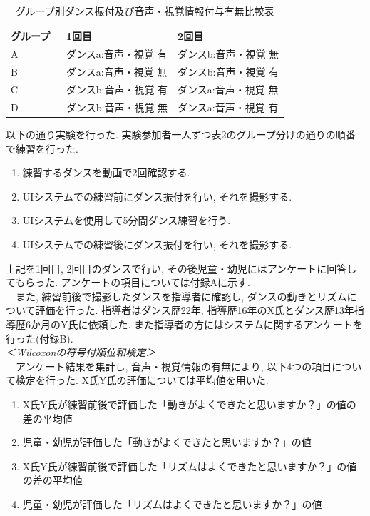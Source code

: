 \documentclass[paper]{ieicej}
\begin{document}
\begin{table}[t]
  \centering
  \caption{グループ別ダンス振付及び音声・視覚情報付与有無比較表}
  \begin{tabularx}{\linewidth}{l p{0.4\linewidth} p{0.4\linewidth}}
    \toprule
      グループ & 1回目 & 2回目 \\
    \midrule
      A & ダンスa:音声・視覚 有 & ダンスb:音声・視覚 無 \\
      B & ダンスa:音声・視覚 無 & ダンスb:音声・視覚 有 \\
      C & ダンスb:音声・視覚 有 & ダンスa:音声・視覚 無 \\
      D & ダンスb:音声・視覚 無 & ダンスa:音声・視覚 有 \\
    \bottomrule
  \end{tabularx}
\end{table}
以下の通り実験を行った. 実験参加者一人ずつ表2のグループ分けの通りの順番で練習を行った.
\begin{enumerate}[label=\arabic*., nosep]
  \item 練習するダンスを動画で2回確認する.  
  \item UIシステムでの練習前にダンス振付を行い, それを撮影する.
  \item UIシステムを使用して5分間ダンス練習を行う. 
  \item UIシステムでの練習後にダンス振付を行い, それを撮影する.
\end{enumerate}
上記を1回目, 2回目のダンスで行い, その後児童・幼児にはアンケートに回答してもらった. アンケートの項目については付録Aに示す. \\
　また, 練習前後で撮影したダンスを指導者に確認し, ダンスの動きとリズムについて評価を行った. 指導者はダンス歴22年, 指導歴16年のX氏とダンス歴13年指導歴6か月のY氏に依頼した. また指導者の方にはシステムに関するアンケートを行った(付録B).\\
\textit{＜Wilcoxonの符号付順位和検定＞}\\
　アンケート結果を集計し, 音声・視覚情報の有無により, 以下4つの項目について検定を行った. X氏Y氏の評価については平均値を用いた. 
\begin{enumerate}[label=\arabic*., nosep]
  \item X氏Y氏が練習前後で評価した「動きがよくできたと思いますか？」の値の差の平均値
  \item 児童・幼児が評価した「動きがよくできたと思いますか？」の値
  \item X氏Y氏が練習前後で評価した「リズムはよくできたと思いますか？」の値の差の平均値
  \item 児童・幼児が評価した「リズムはよくできたと思いますか？」の値
\end{enumerate}
\end{document}
